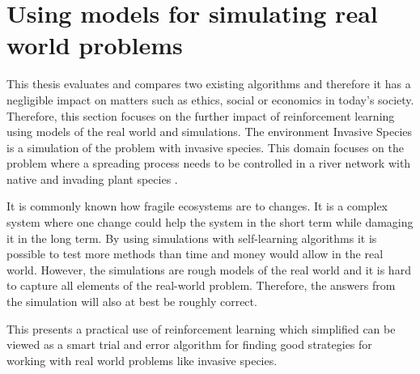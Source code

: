 \section{Using models for simulating real world problems}
\label{sec:ethics_inv_spec}

This thesis evaluates and compares two existing algorithms and therefore it has
a negligible impact on matters such as ethics, social or economics in today's
society. Therefore, this section focuses on the further impact of reinforcement learning using models of the real world and simulations. The environment Invasive Species is a simulation of the problem with invasive
species. This domain focuses on the problem where a spreading process needs to be controlled in a
river network with native and invading plant species
\parencite{invasiveSpecis2014:Online}. 

It is commonly known how fragile ecosystems are to changes. It is a complex
system where one change could help the system in the short term while damaging it in the long
term. By using simulations with self-learning algorithms it is possible to test
more methods than time and money would allow in the real world. However, the simulations are rough models
of the real world and it is hard to capture all elements of the real-world
problem. Therefore, the answers from the simulation will also at best be roughly
correct.

This presents a practical use of reinforcement learning which simplified can be
viewed as a smart trial and error algorithm for finding good strategies for
working with real world problems like invasive species.
